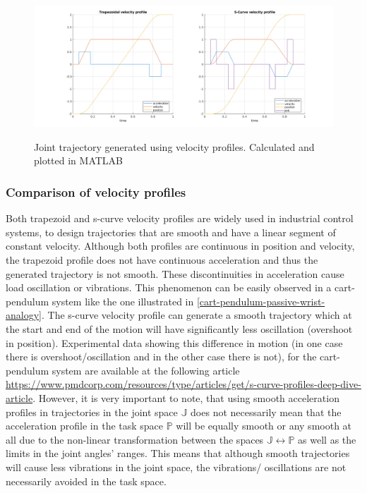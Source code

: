\begin{center}
\begin{figure}[!htb]
\centering
\includegraphics[width=\textwidth]{images/vel-profiles.png}\\
\caption{Joint trajectory generated using velocity profiles. Calculated and plotted in MATLAB} 
\end{figure}
\end{center}


\subsubsection{Comparison of velocity profiles}

Both trapezoid and s-curve velocity profiles are widely used in industrial control systems, to design trajectories that are smooth and have a linear segment of constant velocity. Although both profiles are continuous in
position and velocity, the trapezoid profile does not have continuous acceleration and thus the generated trajectory is not smooth. These discontinuities in acceleration cause load oscillation or vibrations. This 
phenomenon can be easily observed in a cart-pendulum system like the one illustrated in \ref{cart-pendulum-passive-wrist-analogy}. The s-curve velocity profile can generate a smooth trajectory which at the start and end of 
the motion will have significantly less oscillation (overshoot in position). Experimental data showing this difference in motion (in one case there is overshoot/oscillation and in the other case there is not), for the cart-
pendulum system are available at the following article \url{https://www.pmdcorp.com/resources/type/articles/get/s-curve-profiles-deep-dive-article}. However, it is very important to note, that using smooth acceleration 
profiles in trajectories in the joint space $\mathbb{J}$ does not necessarily mean that the acceleration profile in the task space $\mathbb{P}$ will be equally smooth or any smooth at all due to the non-linear transformation 
between the spaces $\mathbb{J} \longleftrightarrow \mathbb{P}$ as well as the limits in the joint angles' ranges. This means that although smooth trajectories will cause less vibrations in the joint space, the vibrations/
oscillations are not necessarily avoided in the task space.

